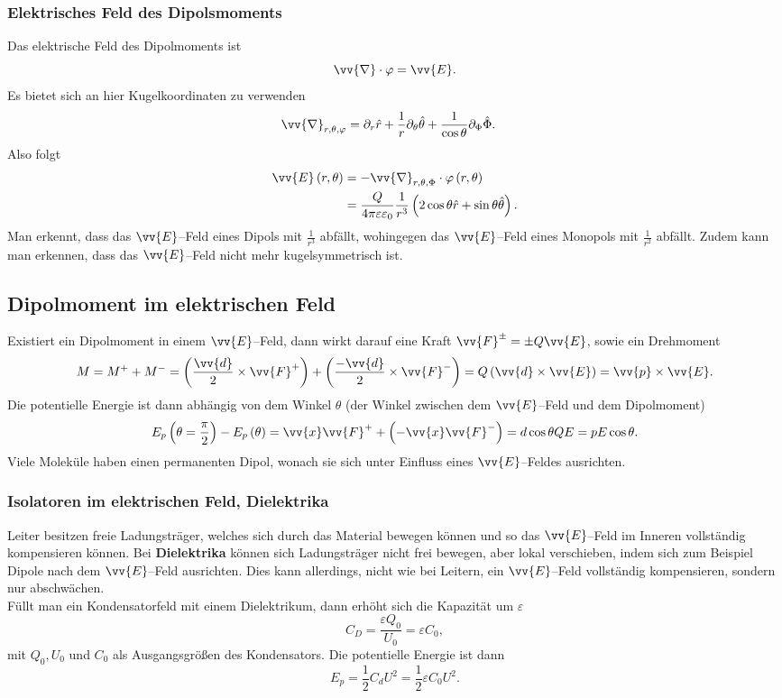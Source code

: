 \subsubsection{Elektrisches Feld des Dipolsmoments}
Das elektrische Feld des Dipolmoments ist
\[ 
        \vv{\nabla }\cdot \varphi =\vv{E}
.\] 
Es bietet sich an hier Kugelkoordinaten zu verwenden
\begin{align*}
        \vv{\nabla }_{r,\theta ,\varphi }&=\partial_r \hat{r}+\dfrac{1}{r}\partial_\theta \hat{\theta }+\dfrac{1}{\cos \theta }\partial_\Phi \hat{\Phi }
.\end{align*}
Also folgt
\begin{align*}
        \vv{E}\left(r,\theta \right)&=-\vv{\nabla }_{r,\theta ,\Phi }\cdot \varphi \left(r,\theta \right)\\
                                    &=\dfrac{Q}{4\pi \varepsilon \varepsilon _0}\dfrac{1}{r^3}\left(2\cos \theta \hat{r}+\sin \theta \hat{\theta }\right)
.\end{align*}
Man erkennt, dass das $\vv{E}$--Feld eines Dipols mit $\tfrac{1}{r^3}$ abfällt, wohingegen das $\vv{E}$--Feld eines Monopols mit $\tfrac{1}{r^2}$ abfällt. Zudem kann man erkennen, dass das $\vv{E}$--Feld nicht mehr kugelsymmetrisch ist.

\subsection{Dipolmoment im elektrischen Feld}
Existiert ein Dipolmoment in einem $\vv{E}$--Feld, dann wirkt darauf eine Kraft $\vv{F}^\pm=\pm Q\vv{E}$, sowie ein Drehmoment
\[ 
        M=M^++M^-=\left(\dfrac{\vv{d}}{2}\times \vv{F}^+\right)+\left(\dfrac{-\vv{d}}{2}\times \vv{F}^-\right)=Q\left(\vv{d}\times \vv{E}\right)=\vv{p}\times \vv{E}
.\] 
Die potentielle Energie ist dann abhängig von dem Winkel $\theta $ (der Winkel zwischen dem $\vv{E}$--Feld und dem Dipolmoment)
\[ 
        E_p\left(\theta =\dfrac{\pi }{2}\right)-E_p\left(\theta \right)=\vv{x}\vv{F}^++\left(-\vv{x}\vv{F}^-\right)=d\cos \theta QE=pE\cos \theta 
.\] 
Viele Moleküle haben einen permanenten Dipol, wonach sie sich unter Einfluss eines $\vv{E}$--Feldes ausrichten.

\subsubsection{Isolatoren im elektrischen Feld, Dielektrika}
Leiter besitzen freie Ladungsträger, welches sich durch das Material bewegen können und so das $\vv{E}$--Feld im Inneren vollständig kompensieren können. Bei \textbf{Dielektrika} können sich Ladungsträger nicht frei bewegen, aber lokal verschieben, indem sich zum Beispiel Dipole nach dem $\vv{E}$--Feld ausrichten. Dies kann allerdings, nicht wie bei Leitern, ein $\vv{E}$--Feld vollständig kompensieren, sondern nur abschwächen.\\\indent
Füllt man ein Kondensatorfeld mit einem Dielektrikum, dann erhöht sich die Kapazität um $\varepsilon $ 
\[ 
        C_D=\dfrac{\varepsilon Q_0}{U_0}=\varepsilon C_0
,\] 
mit $Q_0,U_0$ und $C_0$ als Ausgangsgrößen des Kondensators. Die potentielle Energie ist dann
\[ 
        E_p=\dfrac{1}{2}C_dU^2=\dfrac{1}{2}\varepsilon C_0U^2
.\] 

